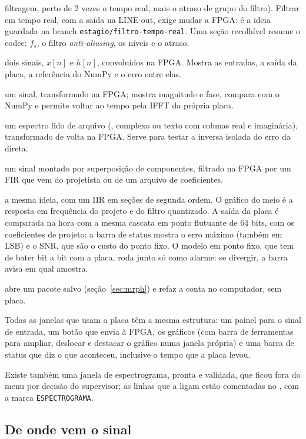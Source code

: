 \begin{description}
    filtragem, perto de 2 vezes o tempo real, mais o atraso de grupo do filtro).
    Filtrar em tempo real, com a saída na LINE-out, exige mudar a FPGA: é a
    ideia guardada na branch \texttt{estagio/filtro-tempo-real}. Uma seção recolhível resume o codec: \(f_s\), o filtro
    \emph{anti-aliasing}, os níveis e o atraso.
  \item[Convolução] dois sinais, \(x[n]\) e \(h[n]\), convoluídos na FPGA. Mostra
    as entradas, a saída da placa, a referência do NumPy e o erro entre elas.
  \item[FFT] um sinal, transformado na FPGA; mostra magnitude e fase, compara com
    o NumPy e permite voltar ao tempo pela IFFT da própria placa.
  \item[IFFT] um espectro lido de arquivo (,  complexo ou
    texto com colunas real e imaginária), transformado de volta na FPGA. Serve
    para testar a inversa isolada do erro da direta.
  \item[Filtro FIR] um sinal montado por superposição de componentes, filtrado
    na FPGA por um FIR que vem do projetista ou de um arquivo de coeficientes.
  \item[Filtro IIR] a mesma ideia, com um IIR em seções de segunda ordem. O
    gráfico do meio é a resposta em frequência do projeto e do filtro
    quantizado. A saída da placa é comparada na hora com a mesma cascata em
    ponto flutuante de 64 bits, com os coeficientes de projeto: a barra de
    status mostra o erro máximo (também em LSB) e o SNR, que são o custo do
    ponto fixo. O modelo em ponto fixo, que tem de bater bit a bit com a placa,
    roda junto só como alarme: se divergir, a barra avisa em qual amostra.
  \item[Comparar .mrph] abre um pacote salvo (seção~\ref{sec:mrph}) e refaz a
    conta no computador, sem placa.
\end{description}

Todas as janelas que usam a placa têm a mesma estrutura: um painel para o sinal
de entrada, um botão que envia à FPGA, os gráficos (com barra de ferramentas
para ampliar, deslocar e destacar o gráfico numa janela própria) e uma barra de
status que diz o que aconteceu, inclusive o tempo que a placa levou.

Existe também uma janela de espectrograma, pronta e validada, que ficou fora do
menu por decisão do supervisor; as linhas que a ligam estão comentadas no
, com a marca \texttt{ESPECTROGRAMA}.

\subsection*{De onde vem o sinal}


